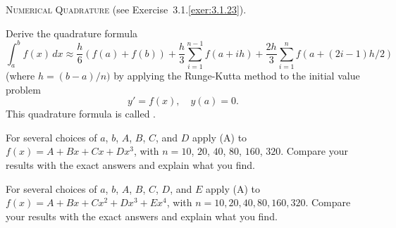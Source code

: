 \begin{exerciselist}
\item\label{exer:3.3.28}{\scshape Numerical Quadrature} (see
{Exercise~3.1.\ref{exer:3.1.23}}).
\begin{alist}
\item %
Derive the quadrature formula
\[
\int_a^bf(x)\,dx\approx \frac{h}{6}(f(a)+f(b))+
\frac{h}{3}\sum_{i=1}^{n-1}f(a+ih)+\frac{2h}{3}\sum_{i=1}^n
f\left(a+(2i-1)h/2\right)\tag{A}
\]
(where $h=(b-a)/n)$
by applying the Runge-Kutta  method to the initial value problem
\[
y'=f(x),\quad y(a)=0.
\]
This quadrature formula is  called
.
\item %
\Lex
For several choices of $a$, $b$, $A$, $B$, $C$, and $D$
 apply (A) to $f(x)=A+Bx+Cx+Dx^3$, with $n = 10$, $20$, $40$,
$80$, $160$, $320$.
Compare your results with the exact answers
and explain what you find.
\item %
\Lex
For several choices of $a$, $b$, $A$, $B$, $C$, $D$, and $E$
 apply (A) to $f(x)=A+Bx+Cx^2+Dx^3+Ex^4$, with
$n=10,20,40,80,160,320$.
 Compare your results with the exact answers
and explain what you find.
\end{alist}

\end{exerciselist}
